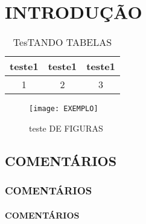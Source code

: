 \documentclass[
        12pt,                           %
        openright,                      %
        twoside,                        %
        a4paper,                        %
        chapter=TITLE,          %
        section=TITLE,          %
        subsection=Title,      %
        english,                        %
        portugues,                         %
        sumario=tradicional             %
        ]{abntex2}
\begin{document}
\renewcommand{\tablename}{TABELA }
\renewcommand{\figurename}{FIGURA }



\textual
\pagestyle{textualUFPR}

\chapter[INTRODUÇÃO]{INTRODUÇÃO}



\begin{table}[!ht]
 \begin{tabular}{c|c|c}
 teste1&teste1&teste1\\\hline\hline
  1&2&3\\\hline
 \end{tabular}

 \par\caption{TesTANDO TABELAS}
 \label{tab:tab01}
\end{table}

\begin{figure}[!ht]
 \centering
 \texttt{[image: EXEMPLO]}
 
 \caption{teste DE FIGURAS}
 \label{fig:01}
\end{figure}


\section{COMENTÁRIOS}
\subsection{COMENTÁRIOS}
\subsubsection{COMENTÁRIOS}
%
\end{document}
